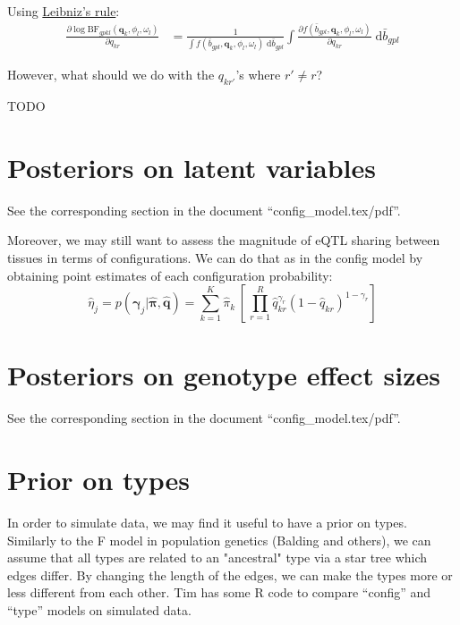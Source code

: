 \documentclass[10pt]{article}
\newcommand{\BF}{{\text{BF}}} %
\newcommand{\der}{{\text{d}}} %
\begin{document}
Using \href{https://en.wikipedia.org/wiki/Leibniz_integral_rule}{Leibniz's rule}:
\begin{equation}
  \begin{aligned}
    \frac{\partial \log \BF_{gpkl}(\bm{q}_k,\phi_l,\omega_l)}{\partial q_{kr}} &= \frac{1}{\int f(\bar{b}_{gpl}, \bm{q}_k,\phi_l,\omega_l) \; \der \bar{b}_{gpl}} \int \frac{\partial f(\bar{b}_{gpl}, \bm{q}_k,\phi_l,\omega_l)}{\partial q_{kr}} \; \der \bar{b}_{gpl}
  \end{aligned}
\end{equation}

However, what should we do with the $q_{kr'}$'s where $r' \ne r$?

TODO



\section{Posteriors on latent variables}

See the corresponding section in the document ``config\_model.tex/pdf''.

Moreover, we may still want to assess the magnitude of eQTL sharing between tissues in terms of configurations.
We can do that as in the config model by obtaining point estimates of each configuration probability:
\begin{equation}
  \hat{\eta}_j = p(\bm{\gamma}_j | \hat{\bm{\pi}}, \hat{\bm{q}}) = \sum_{k=1}^K \hat{\pi}_k \, \left[ \, \prod_{r=1}^R \hat{q}_{kr}^{\gamma_r} (1 - \hat{q}_{kr})^{1 - \gamma_r} \right]
\end{equation}



\section{Posteriors on genotype effect sizes}

See the corresponding section in the document ``config\_model.tex/pdf''.



\section{Prior on types}

In order to simulate data, we may find it useful to have a prior on types.
Similarly to the F model in population genetics (Balding and others), we can assume that all types are related to an "ancestral" type via a star tree which edges differ.
By changing the length of the edges, we can make the types more or less different from each other.
Tim has some R code to compare ``config'' and ``type'' models on simulated data.
\end{document}
